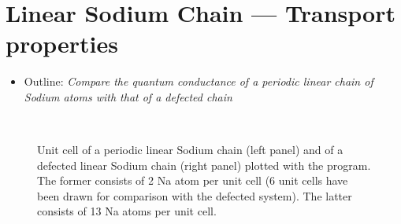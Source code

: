 \section{Linear Sodium Chain --- Transport properties}
\label{sec14:nachain}

\begin{itemize}
\item Outline: {\it Compare the quantum conductance of a periodic linear chain of Sodium atoms with that
of a defected chain}
\end{itemize}


\begin{figure}[h!]
\centering
{}\\
\centering
{}
\label{fig14.1}
\caption{Unit cell of a periodic linear Sodium chain (left panel) and of a defected linear Sodium chain (right panel) plotted with the \xcrysden{} program. The former consists of 2 Na atom per unit cell (6 unit cells have been drawn for comparison with the defected system). The latter consists of 13 Na atoms per unit cell.}
\end{figure}

